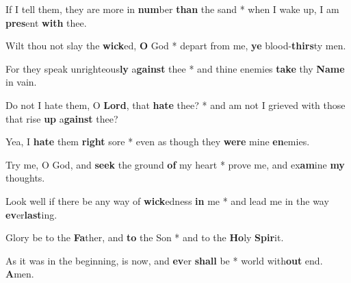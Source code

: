 \begin{multicols}{2}
	If I tell them, they are more in \textbf{num}ber \textbf{than} the sand * when I wake up, I am \textbf{pres}ent \textbf{with} thee.
	
	Wilt thou not slay the \textbf{wick}ed, \textbf{O} God * depart from me, \textbf{ye} blood-\textbf{thirs}ty men.
	
	For they speak unrighteous\textbf{ly} a\textbf{gainst} thee * and thine enemies \textbf{take} thy \textbf{Name} in vain.
	
	Do not I hate them, O \textbf{Lord}, that \textbf{hate} thee? * and am not I grieved with those that rise \textbf{up} a\textbf{gainst} thee?
	
	Yea, I \textbf{hate} them \textbf{right} sore * even as though they \textbf{were} mine \textbf{en}emies.
	
	Try me, O God, and \textbf{seek} the ground \textbf{of} my heart * prove me, and ex\textbf{am}ine \textbf{my} thoughts.
	
	Look well if there be any way of \textbf{wick}edness \textbf{in} me * and lead me in the way \textbf{ev}er\textbf{last}ing.
	
	Glory be to the \textbf{Fa}ther, and \textbf{to} the Son * and to the \textbf{Ho}ly \textbf{Spir}it.
	
	As it was in the beginning, is now, and \textbf{ev}er \textbf{shall} be * world with\textbf{out} end. \textbf{A}men.
\end{multicols}